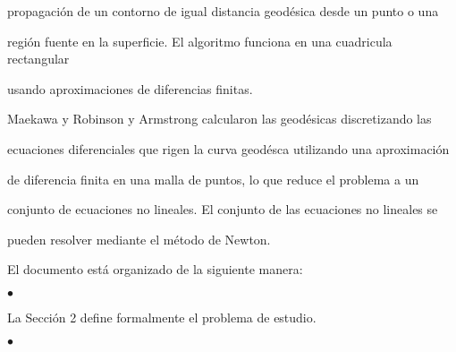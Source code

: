 \documentclass[a4paper,portrait,12pt]{article}
\begin{document}
\begin{flushleft}
propagación de un contorno de igual distancia geodésica desde un punto o una
\end{flushleft}


\begin{flushleft}
región fuente en la superficie. El algoritmo funciona en una cuadricula rectangular
\end{flushleft}


\begin{flushleft}
usando aproximaciones de diferencias finitas.
\end{flushleft}


\begin{flushleft}
Maekawa y Robinson y Armstrong calcularon las geodésicas discretizando las
\end{flushleft}


\begin{flushleft}
ecuaciones diferenciales que rigen la curva geodésca utilizando una aproximación
\end{flushleft}


\begin{flushleft}
de diferencia finita en una malla de puntos, lo que reduce el problema a un
\end{flushleft}


\begin{flushleft}
conjunto de ecuaciones no lineales. El conjunto de las ecuaciones no lineales se
\end{flushleft}


\begin{flushleft}
pueden resolver mediante el método de Newton.
\end{flushleft}





\begin{flushleft}
\newpage
El documento está organizado de la siguiente manera:
\end{flushleft}


$\bullet$





\begin{flushleft}
La Sección 2 define formalmente el problema de estudio.
\end{flushleft}





$\bullet$
\end{document}

